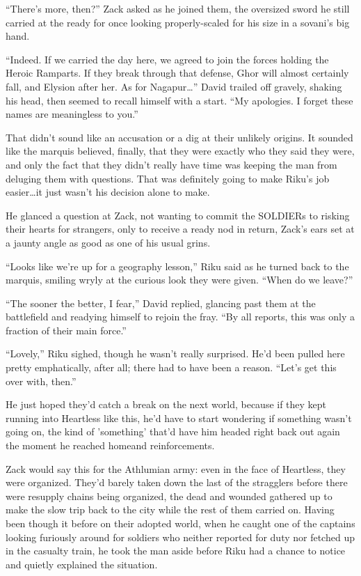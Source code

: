``There's more, then?'' Zack asked as he joined them, the oversized sword he still carried at the ready for once looking properly-scaled for his size in a sovani's big hand.

``Indeed. If we carried the day here, we agreed to join the forces holding the Heroic Ramparts. If they break through that defense, Ghor will almost certainly fall, and Elysion after her. As for Nagapur\ldots '' David trailed off gravely, shaking his head, then seemed to recall himself with a start. ``My apologies. I forget these names are meaningless to you.''

That didn't sound like an accusation or a dig at their unlikely origins. It sounded like the marquis believed, finally, that they were exactly who they said they were, and only the fact that they didn't really have time was keeping the man from deluging them with questions. That was definitely going to make Riku's job easier\ldots it just wasn't his decision alone to make.

He glanced a question at Zack, not wanting to commit the SOLDIERs to risking their hearts for strangers, only to receive a ready nod in return, Zack's ears set at a jaunty angle as good as one of his usual grins.

``Looks like we're up for a geography lesson,'' Riku said as he turned back to the marquis, smiling wryly at the curious look they were given. ``When do we leave?''

``The sooner the better, I fear,'' David replied, glancing past them at the battlefield and readying himself to rejoin the fray. ``By all reports, this was only a fraction of their main force.''

``Lovely,'' Riku sighed, though he wasn't really surprised. He'd been pulled here pretty emphatically, after all; there had to have been a reason. ``Let's get this over with, then.''

He just hoped they'd catch a break on the next world, because if they kept running into Heartless like this, he'd have to start wondering if something wasn't going on, the kind of 'something' that'd have him headed right back out again the moment he reached home\textemdash and reinforcements.


\scenechange


Zack would say this for the Athlumian army: even in the face of Heartless, they were organized. They'd barely taken down the last of the stragglers before there were resupply chains being organized, the dead and wounded gathered up to make the slow trip back to the city while the rest of them carried on. Having been though it before on their adopted world, when he caught one of the captains looking furiously around for soldiers who neither reported for duty nor fetched up in the casualty train, he took the man aside before Riku had a chance to notice and quietly explained the situation.

